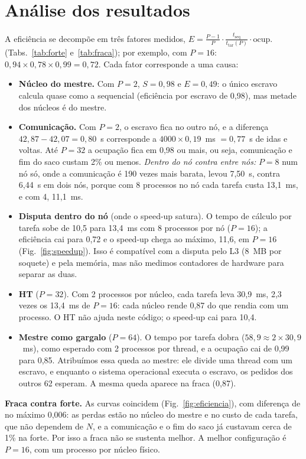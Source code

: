 \documentclass[10pt,a4paper,twocolumn]{article}
\begin{document}
\section{Análise dos resultados}
A eficiência se decompõe em três fatores medidos,
$E=\frac{P-1}{P}\cdot\frac{t_{\mathrm{seq}}}{t_{\mathrm{tar}}(P)}\cdot\mathrm{ocup.}$
(Tabs.~\ref{tab:forte} e~\ref{tab:fraca}); por exemplo, com $P=16$:
$0{,}94\times0{,}78\times0{,}99=0{,}72$. Cada fator corresponde a uma causa:
\begin{itemize}
\item \textbf{Núcleo do mestre.} Com $P=2$, $S=0{,}98$ e $E=0{,}49$: o único escravo calcula
  quase como a sequencial (eficiência por escravo de 0,98), mas metade dos núcleos é do mestre.
\item \textbf{Comunicação.} Com $P=2$, o escravo fica no outro nó, e a diferença
  $42{,}87-42{,}07=0{,}80$~s corresponde a $4000\times0{,}19$~ms $=0{,}77$~s de idas e voltas.
  Até $P=32$ a ocupação fica em 0,98 ou mais, ou seja, comunicação e fim do saco custam 2\% ou
  menos. \emph{Dentro do nó contra entre nós:} $P=8$ num nó só, onde a comunicação é 190 vezes
  mais barata, levou 7,50~s, contra 6,44~s em dois nós, porque com 8 processos no nó cada
  tarefa custa 13,1~ms, e com 4, 11,1~ms.
\item \textbf{Disputa dentro do nó} (onde o speed-up satura). O tempo de cálculo por tarefa
  sobe de 10,5 para 13,4~ms com 8 processos por nó ($P=16$); a eficiência cai para 0,72 e o
  speed-up chega ao máximo, 11,6, em $P=16$ (Fig.~\ref{fig:speedup}). Isso é compatível com
  a disputa pelo L3 (8~MB por soquete) e pela memória, mas não medimos contadores de hardware
  para separar as duas.
\item \textbf{HT} ($P=32$). Com 2 processos por núcleo, cada tarefa leva 30,9~ms, 2,3 vezes os
  13,4~ms de $P=16$: cada núcleo rende 0,87 do que rendia com um processo. O HT não ajuda neste
  código; o speed-up cai para 10,4.
\item \textbf{Mestre como gargalo} ($P=64$). O tempo por tarefa dobra
  ($58{,}9\approx2\times30{,}9$~ms), como esperado com 2 processos por thread, e a ocupação cai
  de 0,99 para 0,85. Atribuímos essa queda ao mestre: ele divide uma thread com um escravo, e
  enquanto o sistema operacional executa o escravo, os pedidos dos outros 62 esperam. A mesma
  queda aparece na fraca (0,87).
\end{itemize}
\textbf{Fraca contra forte.} As curvas coincidem (Fig.~\ref{fig:eficiencia}), com diferença
de no máximo 0,006: as perdas estão no núcleo do mestre e no custo de cada tarefa, que não
dependem de $N$, e a comunicação e o fim do saco já custavam cerca de 1\% na forte. Por isso a
fraca não se sustenta melhor. A melhor configuração é $P=16$, com um processo por núcleo físico.
\end{document}
